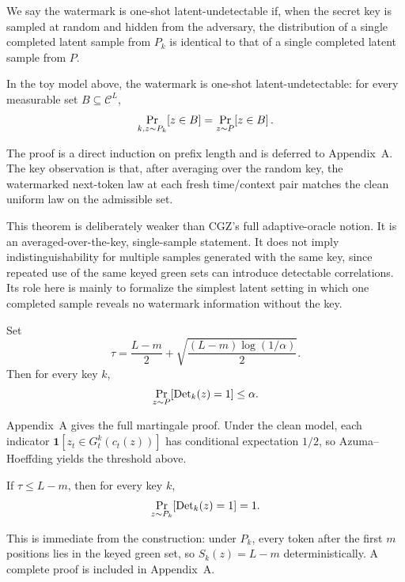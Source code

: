 \documentclass[12pt]{article}
\newcommand{\cC}{\mathcal{C}}
\begin{document}
\begin{definition}
We say the watermark is one-shot latent-undetectable if, when the secret
key is sampled at random and hidden from the adversary, the distribution
of a single completed latent sample from $P_k$ is identical to that of a
single completed latent sample from $P$.
\end{definition}

\begin{theorem}
In the toy model above, the watermark is one-shot latent-undetectable:
for every measurable set $B\subseteq \cC^L$,
\[
\Prob[k,z\sim P_k]{z\in B}=\Prob[z\sim P]{z\in B}.
\]
\end{theorem}

The proof is a direct induction on prefix length and is deferred to
Appendix~A. The key observation is that, after averaging over the random
key, the watermarked next-token law at each fresh time/context pair
matches the clean uniform law on the admissible set.

This theorem is deliberately weaker than CGZ's full adaptive-oracle
notion. It is an averaged-over-the-key, single-sample statement. It
does not imply indistinguishability for multiple samples generated with
the same key, since repeated use of the same keyed green sets can
introduce detectable correlations. Its role here is mainly to formalize
the simplest latent setting in which one completed sample reveals no
watermark information without the key.

\begin{theorem}[Soundness]
Set
\[
\tau = \frac{L-m}{2} + \sqrt{\frac{(L-m)\log(1/\alpha)}{2}}.
\]
Then for every key $k$,
\[
\Prob[z\sim P]{\mathrm{Det}_k(z)=1} \le \alpha.
\]
\end{theorem}

Appendix~A gives the full martingale proof. Under the clean model, each
indicator $\mathbf{1}[z_t\in G_t^k(c_t(z))]$ has conditional
expectation $1/2$, so Azuma--Hoeffding yields the threshold above.

\begin{theorem}[Completeness]
If $\tau \le L-m$, then for every key $k$,
\[
\Prob[z\sim P_k]{\mathrm{Det}_k(z)=1}=1.
\]
\end{theorem}

This is immediate from the construction: under $P_k$, every token after
the first $m$ positions lies in the keyed green set, so
$S_k(z)=L-m$ deterministically. A complete proof is included in
Appendix~A.
\end{document}
